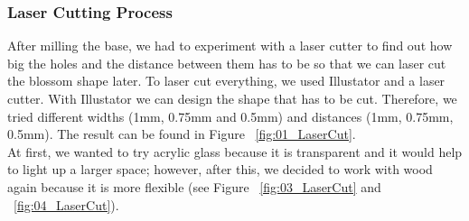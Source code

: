 \documentclass[04.3_buildingProcess.tex]{subfiles}
\begin{document}
    \subsubsection{Laser Cutting Process}

    \noindent
    After milling the base, we had to experiment with a laser cutter to find out how big the holes and the 
    distance between them has to be so that we can laser cut the blossom shape later. To laser cut 
    everything, we used Illustator\cite{illustrator} and a laser cutter. With Illustator we can design 
    the shape that has to be cut. Therefore, we tried different widths (1mm, 0.75mm and 0.5mm) and 
    distances (1mm, 0.75mm, 0.5mm). The result can be found in Figure ~\ref{fig:01_LaserCut}.\\
    \noindent
    At first, we wanted to try acrylic glass because it is transparent and it would help to light up 
    a larger space; however, after this, we decided to work with wood again because it is more flexible
    (see Figure ~\ref{fig:03_LaserCut} and ~\ref{fig:04_LaserCut}).
\end{document}

